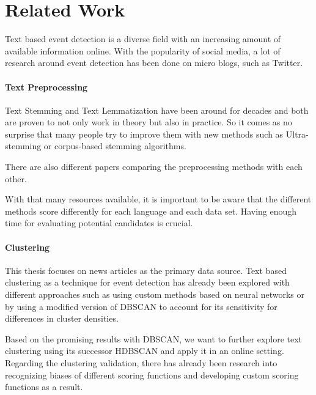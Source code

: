 \section{Related Work}
\label{sec:2_related_work}

Text based event detection is a diverse field with an increasing amount of available information online.
With the popularity of social media, a lot of research around event detection
has been done on micro blogs\cite{microblog_clustering}, such as Twitter\cite{twitter_survey, social_media_survey}.

\paragraph{Text Preprocessing}
Text Stemming and Text Lemmatization have been around for decades and both are proven to not only work
in theory but also in practice.
So it comes as no surprise that many people try to improve them with new methods such as
Ultra-stemming\cite{UltraStemming} or corpus-based stemming algorithms\cite{CorpusBasedStemming}.

There are also different papers comparing the preprocessing methods
with each other\cite{Suryanarayana2015SteppingTA, BounabiMS17}.

With that many resources available, it is important to be aware that the different methods
score differently for each language and each data set.
Having enough time for evaluating potential candidates is crucial.

\paragraph{Clustering}
This thesis focuses on news articles as the primary data source.
Text based clustering as a technique for event detection
has already been explored with different approaches such as
using custom methods based on neural networks\cite{text_clustering_topic_detection}
or by using a modified version of DBSCAN
to account for its sensitivity for differences in cluster densities\cite{dbscan_martingale}.

Based on the promising results with DBSCAN, we want to further explore text clustering
using its successor HDBSCAN\cite{McInnes2017} and apply it in an online setting.
Regarding the clustering validation, there has already been research into recognizing biases
of different scoring functions\cite{Wu:2009:ARM:1557019.1557115}
and developing custom scoring functions as a result\cite{gates2017comparing}.
